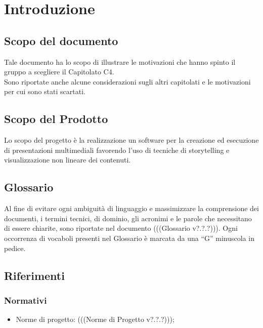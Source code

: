 \section{Introduzione}
\subsection{Scopo del documento}
Tale documento ha lo scopo di illustrare le motivazioni che hanno spinto il gruppo a scegliere il Capitolato C4. \\
Sono riportate anche alcune considerazioni sugli altri capitolati e le motivazioni per cui sono stati scartati.
\subsection{Scopo del Prodotto}
Lo scopo del progetto è la realizzazione un software per la creazione ed esecuzione di presentazioni multimediali favorendo l’uso di tecniche di storytelling e visualizzazione non lineare dei contenuti.
\subsection{Glossario}
Al fine di evitare ogni ambiguità di linguaggio e massimizzare la comprensione dei documenti, i termini tecnici, di dominio, gli acronimi e le parole che necessitano di essere chiarite, sono riportate nel documento (((Glossario v?.?.?))). Ogni occorrenza di vocaboli presenti nel Glossario è marcata da una “G” minuscola in pedice.
\subsection{Riferimenti}

\subsubsection{Normativi}
\begin{itemize}
\item Norme di progetto: (((Norme di Progetto v?.?.?)));
\end{itemize}

